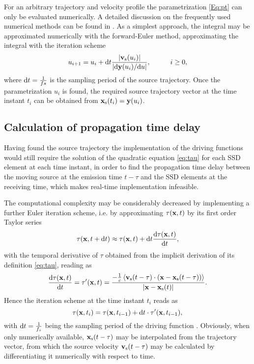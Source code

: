 For an arbitrary trajectory and velocity profile the parametrization \eqref{Eq:pt} can only be evaluated numerically.
A detailed discussion on the frequently used numerical methods can be found in \cite{Parent2012}.
As a simplest approach, the integral may be approximated numerically with the forward-Euler method, approximating the integral with the iteration scheme
\begin{equation}
u_{i+1} = u_i + \td t \frac{|\vvs(u_i)|}{ | \td \mathbf{y}(u_i)/\td u | }, \hspace{10mm} i \geq 0,
\end{equation}
where $\mathrm{d} t = \frac{1}{fs}$ is the sampling period of the source trajectory.
Once the parametrization $u_i$ is found, the required source trajectory vector at the time instant $t_i$ can be obtained from $\mathbf{x}_{\mathrm{s}}(t_i) = \mathbf{y}(u_i)$. 

\subsection{Calculation of propagation time delay}
	
Having found the source trajectory the implementation of the driving functions would still require the solution of the quadratic equation \eqref{eq:tau} for each SSD element at each time instant, in order to find the propagation time delay between the moving source at the emission time $t-\tau$ and the SSD elements at the receiving time, which makes real-time implementation infeasible.

The computational complexity may be considerably decreased by implementing a further Euler iteration scheme, i.e. by approximating $\tau(\mathbf{x},t)$ by its first order Taylor series
\begin{equation}
\tau(\mathbf{x},t+\mathrm{d} t) \approx \tau(\mathbf{x},t) + \mathrm{d} t \frac{\mathrm{d} \tau(\mathbf{x},t)}{\mathrm{d} t},
\end{equation}
with the temporal derivative of $\tau$ obtained from the implicit derivation of its definition \eqref{eq:tau}, reading as
\begin{equation}
\frac{\mathrm{d} \tau(\mathbf{x},t)}{\mathrm{d} t} = \tau'(\mathbf{x},t) = \frac{-\frac{1}{c} \left< \mathbf{v}_{\mathrm{s}}(t-\tau) \cdot ( \mathbf{x}-\mathbf{x}_{\mathrm{s}}(t-\tau) ) \right>}{| \mathbf{x} - \mathbf{x}_{\mathrm{s}}(t) |}.
\end{equation}
Hence the iteration scheme at the time instant $t_i$ reads as
\begin{equation}
\tau(\mathbf{x},t_i) = \tau(\mathbf{x},t_{i-1}) + \mathrm{d} t \cdot \tau'(\mathbf{x},t_{i-1}),
\end{equation}
with $\mathrm{d} t = \frac{1}{f_s}$ being the sampling period of the driving function \cite{doi:10.1121/1.4996126}.
Obviously, when only numerically available, $\mathbf{x}_{\mathrm{s}}(t-\tau)$ may be interpolated from the trajectory vector, from which the source velocity $\mathbf{v}_{\mathrm{s}}(t-\tau)$ may be calculated by differentiating it numerically with respect to time.

